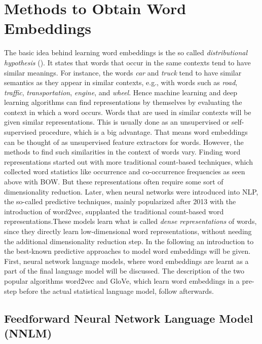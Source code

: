 \documentclass[]{krantz}
\begin{document}
\hypertarget{methods-to-obtain-word-embeddings}{%
\section{Methods to Obtain Word Embeddings}\label{methods-to-obtain-word-embeddings}}

The basic idea behind learning word embeddings is the so called \emph{distributional hypothesis} (\citet{Harris.1954}). It states that words that occur in the same contexts tend to have similar meanings. For instance, the words \emph{car} and \emph{truck} tend to have similar semantics as they appear in similar contexts, e.g., with words such as \emph{road}, \emph{traffic}, \emph{transportation}, \emph{engine}, and \emph{wheel}. Hence machine learning and deep learning algorithms can find representations by themselves by evaluating the context in which a word occurs. Words that are used in similar contexts will be given similar representations. This is usually done as an unsupervised or self-supervised procedure, which is a big advantage. That means word embeddings can be thought of as unsupervised feature extractors for words. However, the methods to find such similarities in the context of words vary. Finding word representations started out with more traditional count-based techniques, which collected word statistics like occurrence and co-occurrence frequencies as seen above with BOW. But these representations often require some sort of dimensionality reduction. Later, when neural networks were introduced into NLP, the so-called predictive techniques, mainly popularized after 2013 with the introduction of word2vec, supplanted the traditional count-based word representations.These models learn what is called \emph{dense representations} of words, since they directly learn low-dimensional word representations, without needing the additional dimensionality reduction step. In the following an introduction to the best-known predictive approaches to model word embeddings will be given. First, neural network language models, where word embeddings are learnt as a part of the final language model will be discussed. The description of the two popular algorithms word2vec and GloVe, which learn word embeddings in a pre-step before the actual statistical language model, follow afterwards.

\hypertarget{feedforward-neural-network-language-model-nnlm}{%
\subsection{Feedforward Neural Network Language Model (NNLM)}\label{feedforward-neural-network-language-model-nnlm}}
\end{document}
